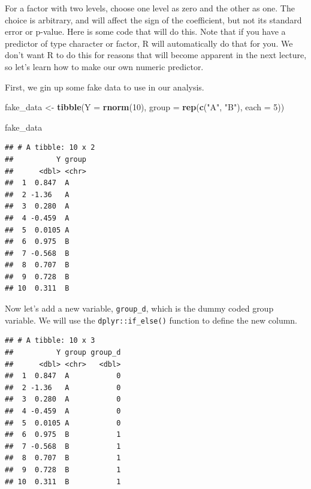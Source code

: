 \documentclass[]{book}
\newenvironment{Shaded}{\begin{snugshade}}{\end{snugshade}}
\newcommand{\DataTypeTok}[1]{\textcolor[rgb]{0.13,0.29,0.53}{#1}}
\newcommand{\DecValTok}[1]{\textcolor[rgb]{0.00,0.00,0.81}{#1}}
\newcommand{\KeywordTok}[1]{\textcolor[rgb]{0.13,0.29,0.53}{\textbf{#1}}}
\newcommand{\NormalTok}[1]{#1}
\newcommand{\OperatorTok}[1]{\textcolor[rgb]{0.81,0.36,0.00}{\textbf{#1}}}
\newcommand{\StringTok}[1]{\textcolor[rgb]{0.31,0.60,0.02}{#1}}
\begin{document}
For a factor with two levels, choose one level as zero and the other as one. The choice is arbitrary, and will affect the sign of the coefficient, but not its standard error or p-value. Here is some code that will do this. Note that if you have a predictor of type character or factor, R will automatically do that for you. We don't want R to do this for reasons that will become apparent in the next lecture, so let's learn how to make our own numeric predictor.

First, we gin up some fake data to use in our analysis.

\begin{Shaded}
\begin{Highlighting}[]
\NormalTok{fake_data <-}\StringTok{ }\KeywordTok{tibble}\NormalTok{(}\DataTypeTok{Y =} \KeywordTok{rnorm}\NormalTok{(}\DecValTok{10}\NormalTok{),}
                    \DataTypeTok{group =} \KeywordTok{rep}\NormalTok{(}\KeywordTok{c}\NormalTok{(}\StringTok{"A"}\NormalTok{, }\StringTok{"B"}\NormalTok{), }\DataTypeTok{each =} \DecValTok{5}\NormalTok{))}

\NormalTok{fake_data}
\end{Highlighting}
\end{Shaded}

\begin{verbatim}
## # A tibble: 10 x 2
##          Y group
##      <dbl> <chr>
##  1  0.847  A    
##  2 -1.36   A    
##  3  0.280  A    
##  4 -0.459  A    
##  5  0.0105 A    
##  6  0.975  B    
##  7 -0.568  B    
##  8  0.707  B    
##  9  0.728  B    
## 10  0.311  B
\end{verbatim}

Now let's add a new variable, \texttt{group\_d}, which is the dummy coded group variable. We will use the \texttt{dplyr::if\_else()} function to define the new column.

\begin{Shaded}
\end{Shaded}

\begin{verbatim}
## # A tibble: 10 x 3
##          Y group group_d
##      <dbl> <chr>   <dbl>
##  1  0.847  A           0
##  2 -1.36   A           0
##  3  0.280  A           0
##  4 -0.459  A           0
##  5  0.0105 A           0
##  6  0.975  B           1
##  7 -0.568  B           1
##  8  0.707  B           1
##  9  0.728  B           1
## 10  0.311  B           1
\end{verbatim}
\end{document}
